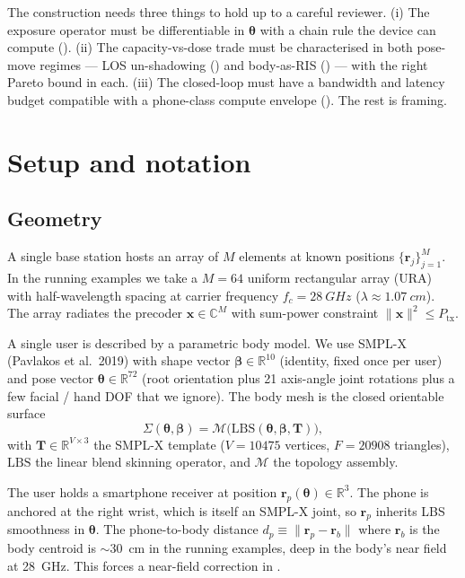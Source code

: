 \documentclass[11pt,a4paper]{article}
\theoremstyle{definition}
\newcommand{\rr}{\mathbf{r}}
\newcommand{\Reals}{\mathbb{R}}
\newcommand{\Complex}{\mathbb{C}}
\newcommand{\xvec}{\mathbf{x}}
\newcommand{\thetab}{\bm{\theta}}
\newcommand{\betab}{\bm{\beta}}
\newcommand{\Mmesh}{\mathcal{M}}
\newcommand{\LBS}{\mathrm{LBS}}
\begin{document}
The construction needs three things to hold up to a careful
reviewer.  (i) The exposure operator must be differentiable in
$\thetab$ with a chain rule the device can compute
().  (ii) The capacity-vs-dose trade must be
characterised in both pose-move regimes — LOS un-shadowing
() and body-as-RIS () —
with the right Pareto bound in each.  (iii) The closed-loop must
have a bandwidth and latency budget compatible with a
phone-class compute envelope ().  The rest is
framing.

\section{Setup and notation}\label{sec:setup}

\subsection{Geometry}

A single base station hosts an array of $M$ elements at known
positions $\{\rr_j\}_{j=1}^M$.  In the running examples we take a
$M=64$ uniform rectangular array (URA) with half-wavelength spacing
at carrier frequency $f_c=\SI{28}{GHz}$
($\lambda\approx\SI{1.07}{cm}$).  The array radiates the precoder
$\xvec\in\Complex^M$ with sum-power constraint
$\|\xvec\|^2\le P_{\mathrm{tx}}$.

A single user is described by a parametric body model.  We use
SMPL-X (Pavlakos et al.\ 2019) with shape vector
$\betab\in\Reals^{10}$ (identity, fixed once per user) and pose
vector $\thetab\in\Reals^{72}$ (root orientation plus 21 axis-angle
joint rotations plus a few facial / hand DOF that we ignore).  The
body mesh is the closed orientable surface
\begin{equation}\label{eq:mesh}
  \Sigma(\thetab,\betab)
   =\Mmesh\bigl(\LBS(\thetab,\betab,\mathbf{T})\bigr),
\end{equation}
with $\mathbf{T}\in\Reals^{V\times 3}$ the SMPL-X template
($V=\num{10475}$ vertices, $F=\num{20908}$ triangles), $\LBS$ the
linear blend skinning operator, and $\Mmesh$ the topology assembly.

The user holds a smartphone receiver at position $\rr_p(\thetab)
\in\Reals^3$.  The phone is anchored at the right wrist, which is
itself an SMPL-X joint, so $\rr_p$ inherits LBS smoothness in
$\thetab$.  The phone-to-body distance $d_p\equiv\|\rr_p-\rr_b\|$
where $\rr_b$ is the body centroid is $\sim$\SI{30}{cm} in the
running examples, deep in the body's near field at \SI{28}{GHz}.
This forces a near-field correction in .
\end{document}
